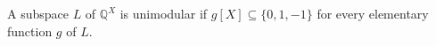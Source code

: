 A subspace $L$ of $\mathbb{Q}^X$ is unimodular if $g[X] \subseteq \{0, 1, -1\}$ for every elementary function $g$ of $L$.
